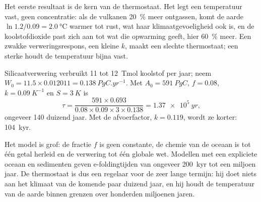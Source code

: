 Het eerste resultaat is de kern van de thermostaat. Het legt een temperatuur vast, geen concentratie: als
de vulkanen \qty{20}{\percent} meer ontgassen, komt de aarde $\ln 1.2/0.09 = \qty{2.0}{\celsius}$
warmer tot rust, wat haar klimaatgevoeligheid ook is, en de koolstofdioxide past zich aan tot wat die
opwarming geeft, hier \qty{60}{\percent} meer. Een zwakke verweringsrespons, een kleine $k$, maakt een slechte
thermostaat; een sterke houdt de temperatuur bijna vast.

\begin{example}\label{ex:b2:deep-time-climate:tau}
Silicaatverwering verbruikt 11 tot \qty{12}{Tmol} koolstof per jaar; neem $W_0 = 11.5\times0.012011
= \qty{0.138}{PgC.yr^{-1}}$. Met $A_0 = \qty{591}{PgC}$, $f = 0.08$, $k = \qty{0.09}{K^{-1}}$ en
$S = \qty{3}{K}$ is
\[
  \tau = \frac{591\times0.693}{0.08\times0.09\times3\times0.138} = \qty{1.37e5}{yr} ,
\]
ongeveer 140 duizend jaar. Met de afvoerfactor, $k = 0.119$, wordt ze korter:
\qty{104}{kyr}.
\end{example}

Het model is grof: de fractie $f$ is geen constante, de chemie van de oceaan is tot één
getal herleid en de verwering tot één globale wet. Modellen met een expliciete oceaan en sedimenten geven
e-foldingtijden van ongeveer \qty{200}{kyr} tot een miljoen jaar. De thermostaat is dus een
regelaar voor de zeer lange termijn: hij doet niets aan het klimaat van de komende paar duizend jaar, en
hij houdt de temperatuur van de aarde binnen grenzen over honderden miljoenen jaren.

